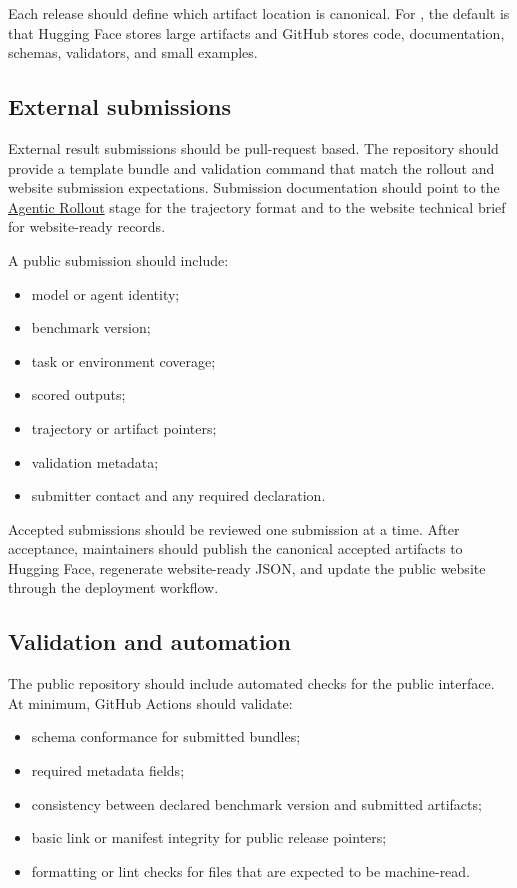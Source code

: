 \documentclass[11pt]{article}
\begin{document}
Each release should define which artifact location is canonical.
For \name{}, the default is that Hugging Face stores large artifacts and GitHub stores code, documentation, schemas, validators, and small examples.

\label{sec:public-repository-submissions}
\subsection*{External submissions}

External result submissions should be pull-request based.
The repository should provide a template bundle and validation command that match the rollout and website submission expectations.
Submission documentation should point to the \hyperref[docstart:agentic_rollout]{Agentic Rollout} stage for the trajectory format and to the website technical brief for website-ready records.

A public submission should include:

\begin{itemize}
\item model or agent identity;
\item benchmark version;
\item task or environment coverage;
\item scored outputs;
\item trajectory or artifact pointers;
\item validation metadata;
\item submitter contact and any required declaration.
\end{itemize}

Accepted submissions should be reviewed one submission at a time.
After acceptance, maintainers should publish the canonical accepted artifacts to Hugging Face, regenerate website-ready JSON, and update the public website through the deployment workflow.

\label{sec:public-repository-validation}
\subsection*{Validation and automation}

The public repository should include automated checks for the public interface.
At minimum, GitHub Actions should validate:

\begin{itemize}
\item schema conformance for submitted bundles;
\item required metadata fields;
\item consistency between declared benchmark version and submitted artifacts;
\item basic link or manifest integrity for public release pointers;
\item formatting or lint checks for files that are expected to be machine-read.
\end{itemize}
\end{document}
